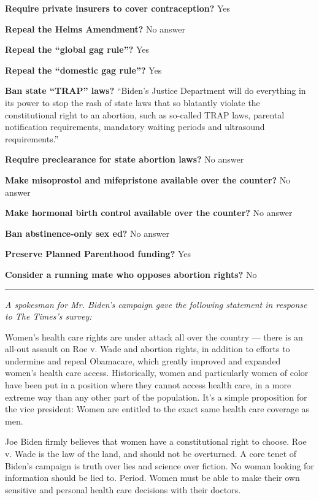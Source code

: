 \textbf{Require private insurers to cover contraception?} Yes

\textbf{Repeal the Helms Amendment?} No answer

\textbf{Repeal the ``global gag rule''?} Yes

\textbf{Repeal the ``domestic gag rule''?} Yes

\textbf{Ban state ``TRAP'' laws?} ``Biden's Justice Department will do
everything in its power to stop the rash of state laws that so blatantly
violate the constitutional right to an abortion, such as so-called TRAP
laws, parental notification requirements, mandatory waiting periods and
ultrasound requirements.''

\textbf{Require preclearance for state abortion laws?} No answer

\textbf{Make misoprostol and mifepristone available over the counter?}
No answer

\textbf{Make hormonal birth control available over the counter?} No
answer

\textbf{Ban abstinence-only sex ed?} No answer

\textbf{Preserve Planned Parenthood funding?} Yes

\textbf{Consider a running mate who opposes abortion rights?} No

\begin{center}\rule{0.5\linewidth}{\linethickness}\end{center}

\emph{A spokesman for Mr. Biden's campaign gave the following statement
in response to The Times's survey:}

Women's health care rights are under attack all over the country ---
there is an all-out assault on Roe v. Wade and abortion rights, in
addition to efforts to undermine and repeal Obamacare, which greatly
improved and expanded women's health care access. Historically, women
and particularly women of color have been put in a position where they
cannot access health care, in a more extreme way than any other part of
the population. It's a simple proposition for the vice president: Women
are entitled to the exact same health care coverage as men.

Joe Biden firmly believes that women have a constitutional right to
choose. Roe v. Wade is the law of the land, and should not be
overturned. A core tenet of Biden's campaign is truth over lies and
science over fiction. No woman looking for information should be lied
to. Period. Women must be able to make their own sensitive and personal
health care decisions with their doctors.

